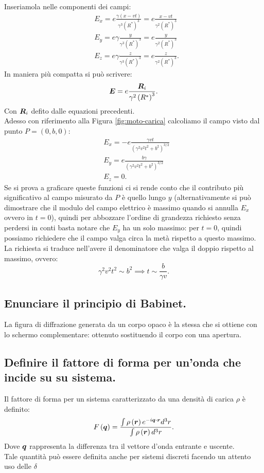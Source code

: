 Inseriamola nelle componenti dei campi: 
\begin{align*}
	&E_x = e \frac{\gamma\left( x-vt \right) }{\gamma^3\left(R^{*}\right)^3} = e \frac{x-vt}{\gamma^2 \left(R^*\right)^3}\\
	&E_y = e \gamma \frac{y}{\gamma^3\left(R^*\right)^3} = e \frac{y}{\gamma^2\left(R^*\right)^3} \\ 
	&E_z = e \gamma \frac{z}{\gamma^3\left(R^*\right)^3} = e \frac{z}{\gamma^2 \left(R^*\right)^3} 
.\end{align*}
In maniera più compatta si può scrivere:
\[
	\boldsymbol{E}=e \frac{\boldsymbol{R}_i}{\gamma^2 \left( R^* \right)^3}
.\] 
Con $\boldsymbol{R}_i$ defito dalle equazioni precedenti.\\
Adesso con riferimento alla Figura \ref{fig:moto-carica} calcoliamo il campo visto dal punto $P=\left( 0,b,0 \right) $:
\begin{align*}
	&E_x = -e \frac{\gamma vt}{\left( \gamma^2v^2t^2 + b^2 \right)^{3 /2} }\\
	&E_y = e \frac{b\gamma }{\left( \gamma^2v^2t^2 + b^2 \right)^{3 /2}}\\
	&E_z = 0
.\end{align*}
Se si prova a graficare queste funzioni ci si rende conto che il contributo più significativo al campo misurato da $P$ è quello lungo $y$ (alternativamente si può dimostrare che il modulo del campo elettrico è massimo quando si annulla $E_x$ ovvero in  $t=0$), quindi per abbozzare l'ordine di grandezza richiesto senza perdersi in conti basta notare che $E_y$ ha un solo massimo: per $t=0$, quindi possiamo richiedere che il campo valga circa la metà rispetto a questo massimo. La richiesta si traduce nell'avere il denominatore che valga il doppio rispetto al massimo, ovvero:
\[
	\gamma^2v^2t^2 \sim b^2 \implies t \sim \frac{b}{\gamma v}
.\] 
\subsection[\hspace{1mm} Principio di Babinet]{Enunciare il principio di Babinet.}
\label{sec:3.a.16}
La figura di diffrazione generata da un corpo opaco è la stessa che si ottiene con lo schermo complementare: ottenuto sostituendo il corpo con una apertura.

\subsection[\hspace{1mm} Fattore di forma]{Definire il fattore di forma per un'onda che incide su su sistema.}
\label{sec:3.a.17}
Il fattore di forma per un sistema caratterizzato da una densità di carica $\rho$ è definito:
\[
	F\left(\boldsymbol{q} \right) = \frac{\int\rho\left( \boldsymbol{r} \right) e^{-i \boldsymbol{q}\cdot \boldsymbol{r}} d^3r}{\int\rho\left( \boldsymbol{r} \right) d^3r}
.\] 
Dove $\boldsymbol{q}$ rappresenta la differenza tra il vettore d'onda entrante e uscente.\\
Tale quantità può essere definita anche per sistemi discreti facendo un attento uso delle $\delta$
